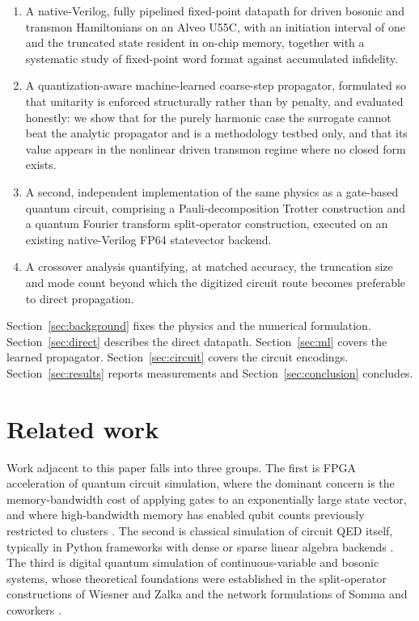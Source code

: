 \documentclass[smallextended]{svjour3}
\begin{document}
\begin{enumerate}
\item A native-Verilog, fully pipelined fixed-point datapath for driven bosonic and
transmon Hamiltonians on an Alveo U55C, with an initiation interval of one and the
truncated state resident in on-chip memory, together with a systematic study of
fixed-point word format against accumulated infidelity.
\item A quantization-aware machine-learned coarse-step propagator, formulated so that
unitarity is enforced structurally rather than by penalty, and evaluated honestly:
we show that for the purely harmonic case the surrogate cannot beat the analytic
propagator and is a methodology testbed only, and that its value appears in the
nonlinear driven transmon regime where no closed form exists.
\item A second, independent implementation of the same physics as a gate-based quantum
circuit, comprising a Pauli-decomposition Trotter construction and a quantum Fourier
transform split-operator construction, executed on an existing native-Verilog FP64
statevector backend.
\item A crossover analysis quantifying, at matched accuracy, the truncation size and
mode count beyond which the digitized circuit route becomes preferable to direct
propagation.
\end{enumerate}

Section~\ref{sec:background} fixes the physics and the numerical formulation.
Section~\ref{sec:direct} describes the direct datapath.
Section~\ref{sec:ml} covers the learned propagator.
Section~\ref{sec:circuit} covers the circuit encodings.
Section~\ref{sec:results} reports measurements and Section~\ref{sec:conclusion}
concludes.

\section{Related work}
\label{sec:related}


Work adjacent to this paper falls into three groups. The first is FPGA acceleration of
quantum circuit simulation, where the dominant concern is the memory-bandwidth cost of
applying gates to an exponentially large state vector, and where high-bandwidth memory
has enabled qubit counts previously restricted to clusters \cite{prior_fpga_sim,
prior_multifpga}. The second is classical simulation of circuit QED itself, typically
in Python frameworks with dense or sparse linear algebra backends \cite{qutip}. The
third is digital quantum simulation of continuous-variable and bosonic systems, whose
theoretical foundations were established in the split-operator constructions of Wiesner
and Zalka and the network formulations of Somma and coworkers \cite{wiesner1996,
zalka1998, somma2002, lloyd1996}.
\end{document}
